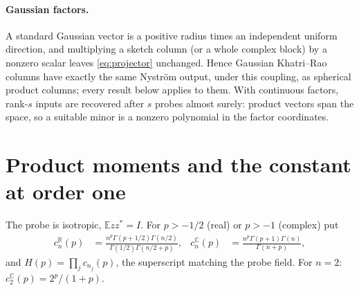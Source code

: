 \documentclass[11pt,a4paper]{article}
\theoremstyle{definition}\newtheorem{definition}[theorem]{Definition}
\theoremstyle{remark}\newtheorem{remark}[theorem]{Remark}
\numberwithin{equation}{section}
\newcommand{\E}{\mathbb E}
\newcommand{\R}{\mathbb R}
\newcommand{\C}{\mathbb C}
\begin{document}
\paragraph{Gaussian factors.}
A standard Gaussian vector is a positive radius times an independent uniform
direction, and multiplying a sketch column (or a whole complex block) by a
nonzero scalar leaves \eqref{eq:projector} unchanged. Hence Gaussian
Khatri--Rao columns have exactly the same Nystr\"om output, under this
coupling, as spherical product columns; every result below applies to them.
With continuous factors, rank-$s$ inputs are recovered after $s$ probes almost
surely: product vectors span the space, so a suitable minor is a nonzero
polynomial in the factor coordinates.

\section{Product moments and the constant at order one}\label{sec:moments}
The probe is isotropic, $\E zz^*=I$. For $p>-1/2$ (real) or $p>-1$ (complex) put
\begin{align}
 c_n^{\R}(p)&=\frac{n^p\Gamma(p+1/2)\Gamma(n/2)}{\Gamma(1/2)\Gamma(n/2+p)},&
 c_n^{\C}(p)&=\frac{n^p\Gamma(p+1)\Gamma(n)}{\Gamma(n+p)},\label{eq:cn}
\end{align}
and $H(p)=\prod_jc_{n_j}(p)$, the superscript matching the probe field.
For $n=2$: $c_2^{\C}(p)=2^p/(1+p)$.
\end{document}
